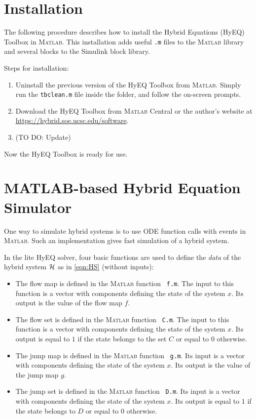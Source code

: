 \documentclass{article}
\newcommand{\HyEQfolder}{\mbox{{\ttfamily{ \color{red} TBD }}}}
\newcommand{\matlab}{\textsc{Matlab}}
\begin{document}
\section{Installation}
\label{sec:installation}

The following procedure describes how to install the Hybrid Equations (HyEQ) Toolbox in \matlab. 
This installation adds useful {\tt .m} files to the \matlab{} library and several blocks to the Simulink block library.

Steps for installation:

\begin{enumerate}
  \item Uninstall the previous version of the HyEQ Toolbox from \matlab{}. 
  Simply run the {\tt tbclean.m} file inside the \HyEQfolder folder, and follow the on-screen prompts.
  \item Download the HyEQ Toolbox from \matlab{} Central or the author's website at \url{https://hybrid.soe.ucsc.edu/software}.
  \item (TO DO: Update)
\end{enumerate}

Now the HyEQ Toolbox is ready for use.

\section{
MATLAB-based Hybrid Equation Simulator}
\label{sec:litesolver}
One way to simulate hybrid systems is to use ODE function calls with events in \matlab{}. 
Such an implementation gives fast simulation of a hybrid system.

In the lite HyEQ solver, four basic functions are used to define the {\em data} of the hybrid system $\mathcal{H}$
as in \eqref{eqn:HS} (without inputs):
\begin{itemize}
\item The flow map is defined in the \matlab{} function {\tt
f.m}. The input to this function is a vector with components defining the state of the system $x$. Its output is the value of the flow map $f$.
\item The flow set is defined in the \matlab{} function {\tt
C.m}. The input to this function is a vector with components defining the state of the system $x$. Its output is equal to $1$ if the state belongs to the set $C$ or equal to $0$ otherwise.
\item The jump map is defined in the \matlab{} function {\tt
g.m}. Its input is a vector with components defining the state of the system $x$. Its output is the value of the jump map $g$.
\item The jump set is defined in the \matlab{} function {\tt
D.m}. Its input is a vector with components defining the state of the system $x$. Its output is equal to $1$ if the state belongs to $D$ or equal to $0$ otherwise.
\end{itemize}
\end{document}
